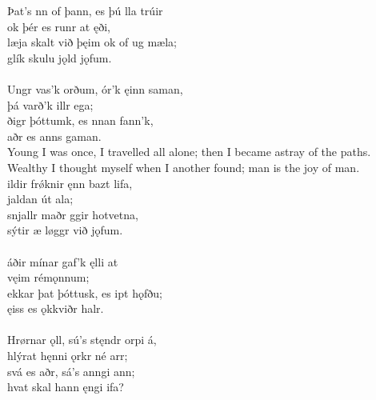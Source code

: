 \bva Þat's nn of þann, \hld es þú lla trúir \\%
\ind ok þér es runr at ęði, \\%
læja skalt við þęim \hld ok of ug mæla; \\%
\ind glík skulu jǫld jǫfum.\\%

 \\

\bva Ungr vas'k orðum, \hld {}ór'k ęinn saman, \\%
\ind þá varð'k illr ega; \\%
ðigr þóttumk, \hld es nnan fann'k, \\%
\ind {}aðr es anns gaman.\\%

\bvb Young I was once, I travelled all alone; then I became astray of the paths. Wealthy I thought myself when I another found; man is the joy of man. \\

\bva {}ildir frǿknir \hld {}ęnn bazt lifa, \\%
\ind {}jaldan út ala; \\%
snjallr maðr \hld {}ggir hotvetna, \\%
\ind sýtir æ løggr við jǫfum.\\%

 \\

\bva {}áðir mínar \hld gaf'k ęlli at \\%
\ind {}vęim rémǫnnum; \\%
ekkar þat þóttusk, \hld es ipt hǫfðu; \\%
\ind {}ęiss es ǫkkviðr halr.\\%

 \\

\bva Hrørnar ǫll, \hld sú's stęndr orpi á, \\%
\ind hlýrat hęnni ǫrkr né arr; \\%
svá es aðr, \hld sá's anngi ann; \\%
\ind hvat skal hann ęngi ifa?\\%

 \\

